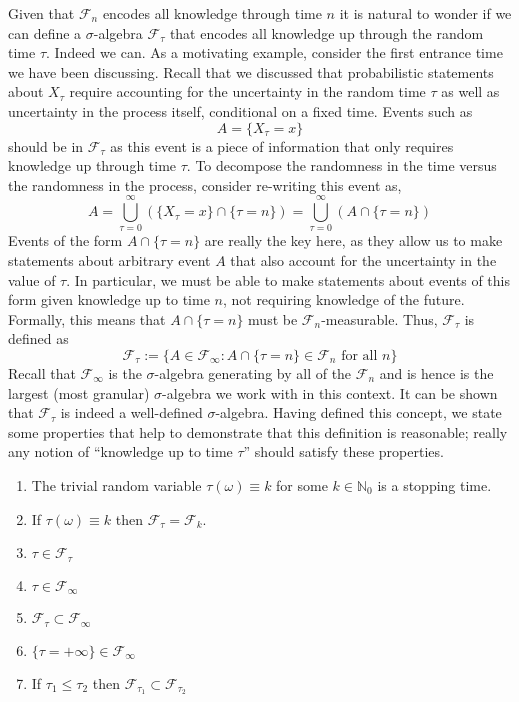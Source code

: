 \documentclass[12pt]{article}
\begin{document}
Given that $\mathcal{F}_n$ encodes all knowledge through time $n$ it is natural to wonder if we can define a $\sigma$-algebra $\mathcal{F}_\tau$ that encodes all knowledge up through the 
random time $\tau$. Indeed we can. As a motivating example, consider the first entrance time we have been discussing. Recall that we discussed that probabilistic statements about $X_\tau$ 
require accounting for the uncertainty in the random time $\tau$ as well as uncertainty in the process itself, conditional on a fixed time. Events such as 
\[A = \{X_\tau = x\}\]
should be in $\mathcal{F}_\tau$ as this event is a piece of information that only requires knowledge up through time $\tau$. To decompose the randomness in the time versus the randomness 
in the process, consider re-writing this event as, 
\[A = \bigcup_{\tau = 0}^{\infty} \left(\{X_\tau = x\} \cap \{\tau = n\}\right) = \bigcup_{\tau = 0}^{\infty} \left(A \cap \{\tau = n\}\right) \]
Events of the form $A \cap \{\tau = n\}$ are really the key here, as they allow us to make statements about arbitrary event $A$ that also account for the uncertainty in the value of 
$\tau$. In particular, we must be able to make statements about events of this form given knowledge up to time $n$, not requiring knowledge of the future. Formally, this means that 
$A \cap \{\tau = n\}$ must be $\mathcal{F}_n$-measurable. Thus, $\mathcal{F}_\tau$ is defined as 
\[\mathcal{F}_\tau := \{A \in \mathcal{F}_\infty : A \cap \{\tau = n\} \in \mathcal{F}_n \text{ for all } n\}\]
Recall that $\mathcal{F}_\infty$ is the $\sigma$-algebra generating by all of the $\mathcal{F}_n$ and is hence is the largest (most granular) $\sigma$-algebra we work with in this context. 
It can be shown that $\mathcal{F}_\tau$ is indeed a well-defined $\sigma$-algebra. Having defined this concept, we state some properties that help to demonstrate that this definition is 
reasonable; really any notion of ``knowledge up to time $\tau$'' should satisfy these properties. 
\begin{enumerate}
\item The trivial random variable $\tau(\omega) \equiv k$ for some $k \in \mathbb{N}_0$ is a stopping time. 
\item If $\tau(\omega) \equiv k$ then $\mathcal{F}_\tau = \mathcal{F}_k$. 
\item $\tau \in \mathcal{F}_\tau$
\item $\tau \in \mathcal{F}_\infty$
\item $\mathcal{F}_\tau \subset \mathcal{F}_\infty$
\item $\{\tau = +\infty\} \in \mathcal{F}_\infty$
\item If $\tau_1 \leq \tau_2$ then $\mathcal{F}_{\tau_1} \subset \mathcal{F}_{\tau_2}$
\end{enumerate}
\end{document}
